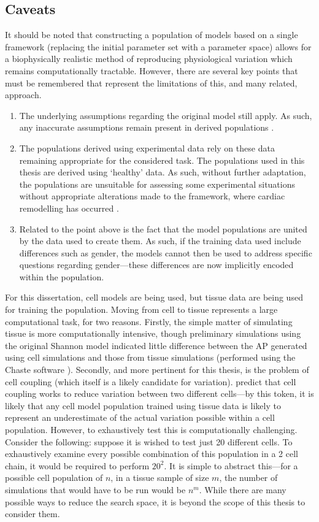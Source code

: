 \documentclass[../thesis-main.tex]{subfiles}
\begin{document}
\subsection{Caveats}
\label{subsec:caveats}
It should be noted that constructing a population of models based on a single framework (replacing the initial parameter set with a parameter space) allows for a biophysically realistic method of reproducing physiological variation which remains computationally tractable. However, there are several key points that must be remembered that represent the limitations of this, and many related, approach.
\begin{enumerate}
 \item The underlying assumptions regarding the original model still apply. As such, any inaccurate assumptions remain present in derived populations \citet{Noble2001, Quinn2013}.
 \item The populations derived using experimental data rely on these data remaining appropriate for the considered task. The populations used in this thesis are derived using `healthy' data. As such, without further adaptation, the populations are unsuitable for assessing some experimental situations without appropriate alterations made to the framework, \eg{} where cardiac remodelling has occurred \citep{Walmsley2013}.
 \item Related to the point above is the fact that the model populations are united by the data used to create them. As such, if the training data used include differences such as gender, the models cannot then be used to address specific questions regarding gender---these differences are now implicitly encoded within the population.
\end{enumerate}

For this dissertation, cell models are being used, but tissue data are being used for training the population. Moving from cell to tissue represents a large computational task, for two reasons. Firstly, the simple matter of simulating tissue is more computationally intensive, though preliminary simulations using the original Shannon model indicated little difference between the AP generated using cell simulations and those from tissue simulations (performed using the Chaste software \citep{Mirams2013}). Secondly, and more pertinent for this thesis, is the problem of cell coupling (which itself is a likely candidate for variation). \citet{Heijman2013} predict that cell coupling works to reduce variation between two different cells---by this token, it is likely that any cell model population trained using tissue data is likely to represent an underestimate of the actual variation possible within a cell population. However, to exhaustively test this is computationally challenging. Consider the following: suppose it is wished to test just 20 different cells. To exhaustively examine every possible combination of this population in a 2 cell chain, it would be required to perform $20^2$. It is simple to abstract this---for a possible cell population of $n$, in a tissue sample of size $m$, the number of simulations that would have to be run would be $n^m$. While there are many possible ways to reduce the search space, it is beyond the scope of this thesis to consider them.
\end{document}
